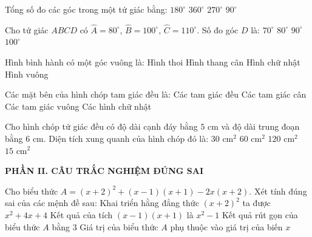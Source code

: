 \documentclass[12pt,a4paper]{article}
\begin{document}
\begin{ex}
Tổng số đo các góc trong một tứ giác bằng:
\choice
{$180^\circ$}
{\True $360^\circ$}
{$270^\circ$}
{$90^\circ$}
\end{ex}

\begin{ex}
Cho tứ giác $ABCD$ có $\widehat{A} = 80^\circ$, $\widehat{B} = 100^\circ$, $\widehat{C} = 110^\circ$. Số đo góc $D$ là:
\choice
{\True $70^\circ$}
{$80^\circ$}
{$90^\circ$}
{$100^\circ$}
\end{ex}

\begin{ex}
Hình bình hành có một góc vuông là:
\choice
{Hình thoi}
{Hình thang cân}
{\True Hình chữ nhật}
{Hình vuông}
\end{ex}

\begin{ex}
Các mặt bên của hình chóp tam giác đều là:
\choice
{Các tam giác đều}
{\True Các tam giác cân}
{Các tam giác vuông}
{Các hình chữ nhật}
\end{ex}

\begin{ex}
Cho hình chóp tứ giác đều có độ dài cạnh đáy bằng $5\text{ cm}$ và độ dài trung đoạn bằng $6\text{ cm}$. Diện tích xung quanh của hình chóp đó là:
\choice
{$30\text{ cm}^2$}
{\True $60\text{ cm}^2$}
{$120\text{ cm}^2$}
{$15\text{ cm}^2$}
\end{ex}


\setcounter{ex}{0}
\noindent\textbf{\large PHẦN II. CÂU TRẮC NGHIỆM ĐÚNG SAI}
\vspace{1mm}
\begin{ex}
Cho biểu thức $A = (x + 2)^2 + (x - 1)(x + 1) - 2x(x + 2)$. Xét tính đúng sai của các mệnh đề sau:
\choiceTF
{\True Khai triển hằng đẳng thức $(x + 2)^2$ ta được $x^2 + 4x + 4$}
{\True Kết quả của tích $(x - 1)(x + 1)$ là $x^2 - 1$}
{\True Kết quả rút gọn của biểu thức $A$ bằng $3$}
{Giá trị của biểu thức $A$ phụ thuộc vào giá trị của biến $x$}
\end{ex}
\end{document}
